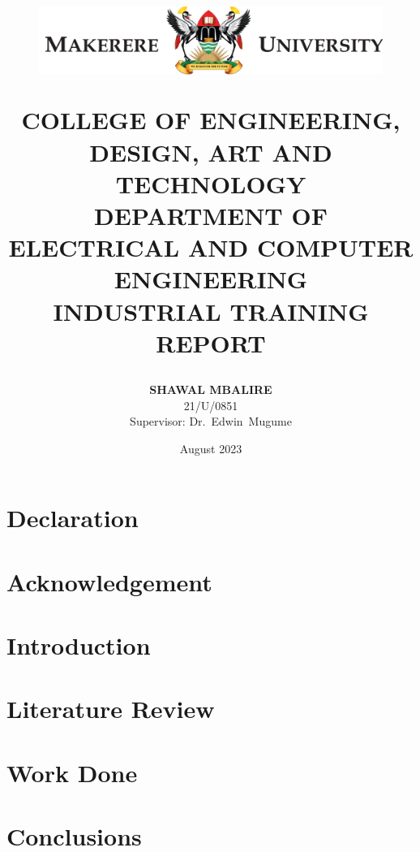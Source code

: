 \documentclass[12pt,a4paper]{report}
\title{
    \begin{figure}[H]
        \centering
        \includegraphics{mak_logo.png}
    \end{figure}
    \vspace{20pt}
    \normalsize COLLEGE OF ENGINEERING, DESIGN, ART AND TECHNOLOGY\vspace{15pt}\\
    DEPARTMENT OF ELECTRICAL AND COMPUTER ENGINEERING\\
    \vspace{50pt}
    \textbf{{\large INDUSTRIAL TRAINING REPORT}}
}
\author{
    \normalsize\textbf{SHAWAL MBALIRE} \\
    \normalsize 21/U/0851 \vspace{50pt} \\
    \normalsize Supervisor: Dr.\ Edwin\  Mugume\\
    \vspace{20pt}
}
\date{\normalsize \vspace{40pt} August 2023}
\begin{document}
    \maketitle

    \chapter*{Declaration}
    

    \newpage
    \chapter*{Acknowledgement}
    

    \newpage
    \tableofcontents

    \newpage
    \listoffigures

    \newpage
    \listoftables

    \chapter{Introduction}
    


    \newpage
    \chapter{Literature Review}
    

    \newpage
    \chapter{Work Done}
    

    \newpage
    \chapter{Conclusions}
    

    \newpage
    
    
\end{document}
